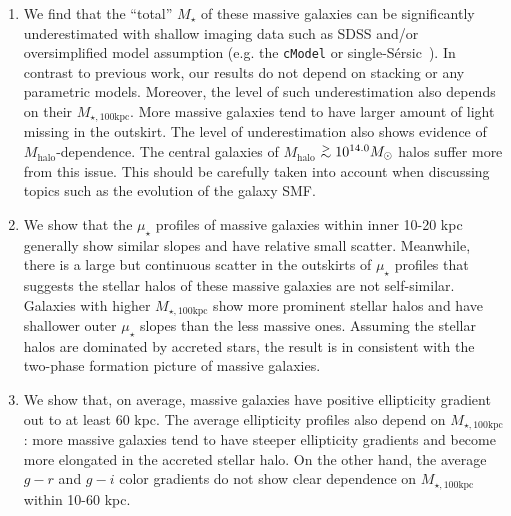 \documentclass[a4paper,fleqn,usenatbib]{mnras}
\def\simgt{\lower.5ex\hbox{$\; \buildrel > \over {\sim} \;$}}
\def\ser{{S\'{e}rsic\ }}
\def\mstar{{$M_{\star}$}}
\def\mhalo{{$M_{\mathrm{halo}}$}}
\def\mtot{{$M_{\star,100\mathrm{kpc}}$}}
\def\mden{{$\mu_{\star}$}}
\begin{document}
    \begin{enumerate}
        \item We find that the ``total'' \mstar{} of these massive galaxies can be 
            significantly underestimated with shallow imaging data such as SDSS and/or 
            oversimplified model assumption (e.g. the \texttt{cModel} or single-\ser{}). 
            In contrast to previous work, our results do not depend on stacking or any 
            parametric models. 
            Moreover, the level of such underestimation also depends on their \mtot{}.
            More massive galaxies tend to have larger amount of light missing in the 
            outskirt.  
            The level of underestimation also shows evidence of \mhalo{}-dependence. 
            The central galaxies of \mhalo{}$\simgt 10^{14.0} M_{\odot}$ halos suffer
            more from this issue. 
            This should be carefully taken into account when discussing topics such 
            as the evolution of the galaxy SMF.
            
        \item We show that the \mden{} profiles of massive galaxies within inner 
            10-20 kpc generally show similar slopes and have relative small scatter. 
            Meanwhile, there is a large but continuous scatter in the outskirts of 
            \mden{} profiles that suggests the stellar halos of these massive galaxies 
            are not self-similar. 
            Galaxies with higher \mtot{} show more prominent stellar halos and have 
            shallower outer \mden{} slopes than the less massive ones. 
            Assuming the stellar halos are dominated by accreted stars, the result is 
            in consistent with the two-phase formation picture of massive galaxies.  
        
        \item We show that, on average, massive galaxies have positive ellipticity 
            gradient out to at least 60 kpc. 
            The average ellipticity profiles also depend on \mtot{}: more massive 
            galaxies tend to have steeper ellipticity gradients and become more 
            elongated in the accreted stellar halo. 
            On the other hand, the average $g-r$ and $g-i$ color gradients do not 
            show clear dependence on \mtot{} within 10-60 kpc. 
            
    \end{enumerate}
\end{document}
